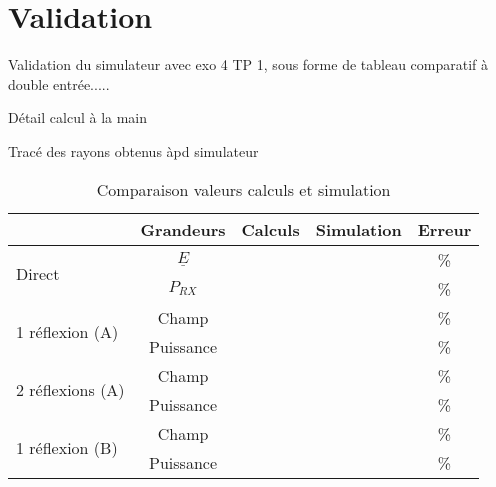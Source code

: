 \chapter{Validation}
\label{chaper-3}

Validation du simulateur avec exo 4 TP 1, sous forme de tableau comparatif à double entrée.....

Détail calcul à la main

Tracé des rayons obtenus àpd simulateur



\begin{table}
    \centering
    \begin{tabular}{|l|c|c|c|c|}
         \hline
                                  & Grandeurs & Calculs & Simulation & Erreur \\
        \hline
\multirow{2}{*}{Direct}           & $\underline{E}$ &         &      & \%     \\
                                  & $P_{RX}$        &         &      & \%     \\
        \hline
\multirow{2}{*}{1 réflexion (A)}  & Champ     &         &      & \%     \\
                                  & Puissance &         &      & \%     \\
        \hline
\multirow{2}{*}{2 réflexions (A)} & Champ     &         &      & \%     \\
                                  & Puissance &         &      & \%     \\
        \hline
\multirow{2}{*}{1 réflexion (B)}  & Champ     &         &      & \%     \\
                                  & Puissance &         &      & \%     \\
        \hline
    \end{tabular}
    \caption{Comparaison valeurs calculs et simulation}
    \label{tab:comparaison-calculs-simulation}
\end{table}
